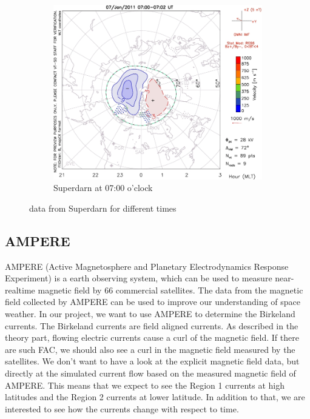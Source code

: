 \documentclass[10pt,a4paper]{article}
\begin{document}
\begin{figure}[h]
\begin{subfigure}{0.3\textwidth}
	\includegraphics[width=\textwidth]{Superdarn14.jpg}
	\caption{ Superdarn at 07:00 o'clock \label{Super_07}}
\end{subfigure}
\caption{data from Superdarn for different times}
\end{figure}


\subsection{AMPERE}
AMPERE (Active Magnetosphere and Planetary Electrodynamics Response Experiment) is a earth observing system, which can be used to measure near-realtime magnetic field by 66 commercial satellites.
The data from the magnetic field collected by AMPERE can be used to improve our understanding of space weather.
In our project, we want to use AMPERE to determine the Birkeland currents. The Birkeland currents are field aligned currents. As described in the theory part, flowing electric currents cause a curl of the magnetic field. If there are such FAC, we should also see a curl in the magnetic field measured by the satellites.
We don't want to have a look at the explicit magnetic field data, but directly at the simulated current flow based on the measured magnetic field of AMPERE. This means that we expect to see the Region 1 currents at high latitudes and the Region 2 currents at lower latitude. 
In addition to that, we are interested to see how the currents change with respect to time. 
\end{document}

